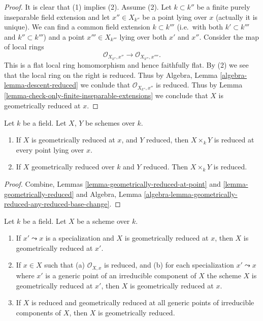\begin{proof}
It is clear that (1) implies (2). Assume (2).
Let $k \subset k''$ be a finite purely inseparable field extension
and let $x'' \in X_{k''}$ be a point lying over $x$ (actually it is
unique). We can find a common field extension $k \subset k'''$
(i.e.\ with both $k' \subset k'''$ and $k'' \subset k'''$) and a point
$x''' \in X_{k'''}$ lying over both $x'$ and $x''$.
Consider the map of local rings
$$
\mathcal{O}_{X_{k''}, x''} \longrightarrow \mathcal{O}_{X_{k'''}, x''''}.
$$
This is a flat local ring homomorphism and hence faithfully flat.
By (2) we see that the local ring on the right is reduced.
Thus by Algebra, Lemma \ref{algebra-lemma-descent-reduced}
we conlude that $\mathcal{O}_{X_{k''}, x''}$ is reduced.
Thus by Lemma \ref{lemma-check-only-finite-inseparable-extensions}
we conclude that $X$ is geometrically reduced at $x$.
\end{proof}

\begin{lemma}
\label{lemma-geometrically-reduced-any-base-change}
Let $k$ be a field.
Let $X$, $Y$ be schemes over $k$.
\begin{enumerate}
\item If $X$ is geometrically reduced at $x$, and $Y$ reduced,
then $X \times_k Y$ is reduced at every point lying over $x$.
\item If $X$ geometrically reduced over $k$ and $Y$ reduced.
Then $X \times_k Y$ is reduced.
\end{enumerate}
\end{lemma}

\begin{proof}
Combine, Lemmas \ref{lemma-geometrically-reduced-at-point}
and \ref{lemma-geometrically-reduced} and Algebra,
Lemma \ref{algebra-lemma-geometrically-reduced-any-reduced-base-change}.
\end{proof}

\begin{lemma}
\label{lemma-generic-points-geometrically-reduced}
Let $k$ be a field.
Let $X$ be a scheme over $k$.
\begin{enumerate}
\item If $x' \leadsto x$ is a specialization and $X$ is geometrically
reduced at $x$, then $X$ is geometrically reduced at $x'$.
\item If $x \in X$ such that (a) $\mathcal{O}_{X, x}$
is reduced, and (b) for each specialization $x' \leadsto x$ where
$x'$ is a generic point of an irreducible component of $X$ the
scheme $X$ is geometrically reduced at $x'$, then $X$ is geometrically
reduced at $x$.
\item If $X$ is reduced and geometrically reduced at all generic
points of irreducible components of $X$, then $X$ is geometrically
reduced.
\end{enumerate}
\end{lemma}

